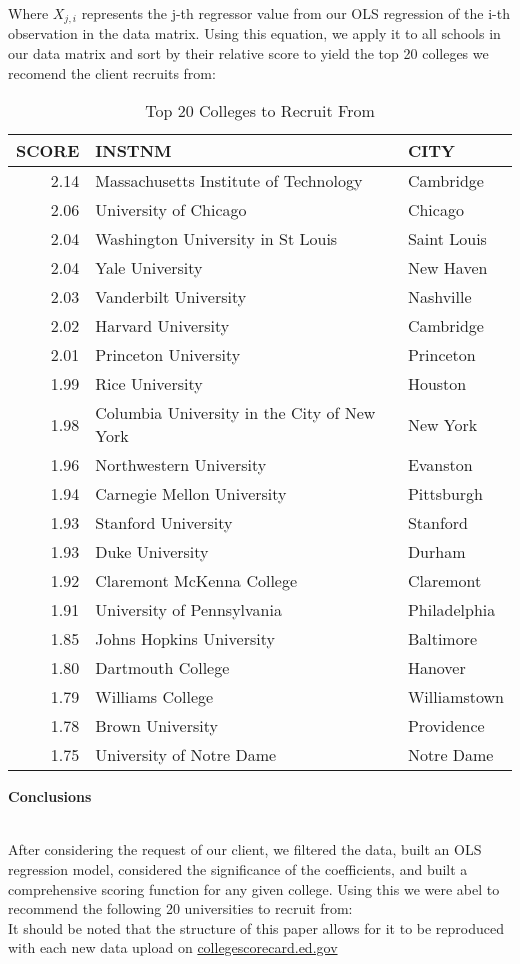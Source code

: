 \documentclass[11pt,english]{article}
\begin{document}
Where $X_{j,i}$ represents the j-th regressor value from our OLS regression of the i-th observation in the data matrix. Using this equation, we apply it to all schools in our data matrix and sort by their relative score to yield the top 20 colleges we recomend the client recruits from:
\begin{table}[ht]
\centering
\begin{tabular}{rll}
  \hline
SCORE & INSTNM & CITY \\ 
  \hline
2.14 & Massachusetts Institute of Technology & Cambridge \\ 
  2.06 & University of Chicago & Chicago \\ 
  2.04 & Washington University in St Louis & Saint Louis \\ 
  2.04 & Yale University & New Haven \\ 
  2.03 & Vanderbilt University & Nashville \\ 
  2.02 & Harvard University & Cambridge \\ 
  2.01 & Princeton University & Princeton \\ 
  1.99 & Rice University & Houston \\ 
  1.98 & Columbia University in the City of New York & New York \\ 
  1.96 & Northwestern University & Evanston \\ 
  1.94 & Carnegie Mellon University & Pittsburgh \\ 
  1.93 & Stanford University & Stanford \\ 
  1.93 & Duke University & Durham \\ 
  1.92 & Claremont McKenna College & Claremont \\ 
  1.91 & University of Pennsylvania & Philadelphia \\ 
  1.85 & Johns Hopkins University & Baltimore \\ 
  1.80 & Dartmouth College & Hanover \\ 
  1.79 & Williams College & Williamstown \\ 
  1.78 & Brown University & Providence \\ 
  1.75 & University of Notre Dame & Notre Dame \\ 
   \hline
\end{tabular}
\caption{Top 20 Colleges to Recruit From} 
\end{table}
\vspace*{5\baselineskip}


{\large\textbf{Conclusions}} \\\

After considering the request of our client, we filtered the data, built an OLS regression model, considered the significance of the coefficients, and built a comprehensive scoring function for any given college. Using this we were abel to recommend the following 20 universities to recruit from:
\\
It should be noted that the structure of this paper allows for it to be reproduced with each new data upload on \href{https://collegescorecard.ed.gov/data}{collegescorecard.ed.gov}
\end{document}
